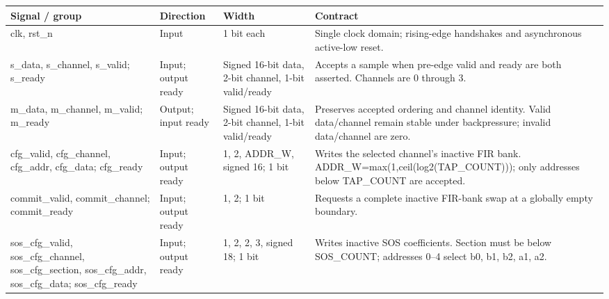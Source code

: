\documentclass[11pt,a4paper]{article}
\begin{document}
{\small\renewcommand{\arraystretch}{1.18}\begin{longtable}{@{}L{0.21\textwidth}|L{0.12\textwidth}|L{0.12\textwidth}|L{0.45\textwidth}@{}}\toprule

\textbf{Signal /\allowbreak{} group} & \textbf{Direction} & \textbf{Width} & \textbf{Contract}\\\midrule\endhead

clk,\allowbreak{} rst\_\allowbreak{}n & Input & 1 bit each & Single clock domain; rising-edge handshakes and asynchronous active-low reset.\\[2pt]\hline

s\_\allowbreak{}data,\allowbreak{} s\_\allowbreak{}channel,\allowbreak{} s\_\allowbreak{}valid; s\_\allowbreak{}ready & Input; output ready & Signed 16-bit data,\allowbreak{} 2-bit channel,\allowbreak{} 1-bit valid/\allowbreak{}ready & Accepts a sample when pre-edge valid and ready are both asserted. Channels are 0 through 3.\\[2pt]\hline

m\_\allowbreak{}data,\allowbreak{} m\_\allowbreak{}channel,\allowbreak{} m\_\allowbreak{}valid; m\_\allowbreak{}ready & Output; input ready & Signed 16-bit data,\allowbreak{} 2-bit channel,\allowbreak{} 1-bit valid/\allowbreak{}ready & Preserves accepted ordering and channel identity. Valid data/\allowbreak{}channel remain stable under backpressure; invalid data/\allowbreak{}channel are zero.\\[2pt]\hline

cfg\_\allowbreak{}valid,\allowbreak{} cfg\_\allowbreak{}channel,\allowbreak{} cfg\_\allowbreak{}addr,\allowbreak{} cfg\_\allowbreak{}data; cfg\_\allowbreak{}ready & Input; output ready & 1,\allowbreak{} 2,\allowbreak{} ADDR\_\allowbreak{}W,\allowbreak{} signed 16; 1 bit & Writes the selected channel's inactive FIR bank. ADDR\_\allowbreak{}W=\allowbreak{}max(\allowbreak{}1,\allowbreak{}ceil(\allowbreak{}log2(\allowbreak{}TAP\_\allowbreak{}COUNT)\allowbreak{})\allowbreak{})\allowbreak{}; only addresses below TAP\_\allowbreak{}COUNT are accepted.\\[2pt]\hline

commit\_\allowbreak{}valid,\allowbreak{} commit\_\allowbreak{}channel; commit\_\allowbreak{}ready & Input; output ready & 1,\allowbreak{} 2; 1 bit & Requests a complete inactive FIR-bank swap at a globally empty boundary.\\[2pt]\hline

sos\_\allowbreak{}cfg\_\allowbreak{}valid,\allowbreak{} sos\_\allowbreak{}cfg\_\allowbreak{}channel,\allowbreak{} sos\_\allowbreak{}cfg\_\allowbreak{}section,\allowbreak{} sos\_\allowbreak{}cfg\_\allowbreak{}addr,\allowbreak{} sos\_\allowbreak{}cfg\_\allowbreak{}data; sos\_\allowbreak{}cfg\_\allowbreak{}ready & Input; output ready & 1,\allowbreak{} 2,\allowbreak{} 2,\allowbreak{} 3,\allowbreak{} signed 18; 1 bit & Writes inactive SOS coefficients. Section must be below SOS\_\allowbreak{}COUNT; addresses 0–4 select b0,\allowbreak{} b1,\allowbreak{} b2,\allowbreak{} a1,\allowbreak{} a2.\\[2pt]\hline


\end{longtable}}
\end{document}
